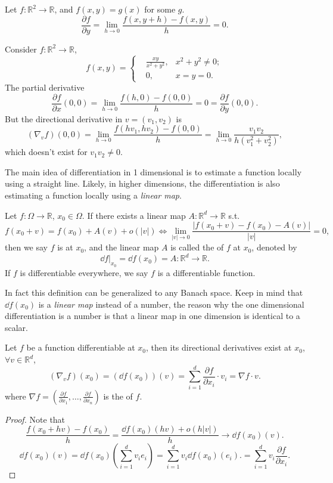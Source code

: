 \begin{example}
    Let $f: \mathbb{R}^2\to \mathbb{R}$, and $f(x,y) = g(x)$ for some $g$.
	\[
	\frac{\partial f}{\partial y} = \lim_{h\to 0}\frac{f(x,y+h) - f(x,y)}{h} = 0.
	\]
\end{example}
\begin{example}
    Consider $f: \mathbb{R}^2\to \mathbb{R}$,
	\[
	f(x,y) = \left\{
	\begin{aligned}
		&\frac{xy}{x^2+y^2}, &x^2+y^2 \ne 0;\\
		&0, &x = y =0.
	\end{aligned}\right.
	\]
	The partial derivative
	\[
		\frac{\partial f}{\partial x}(0,0) =
		\lim_{h\to 0} \frac{f(h,0)-f(0,0)}{h} = 0 = \frac{\partial f}{\partial y}(0,0).
	\]
	But the directional derivative in $v=(v_1,v_2)$ is
	\[
		(\nabla_v f)(0,0) = \lim_{h\to 0}\frac{f(hv_1,hv_2) - f(0,0)}{h}
		= \lim_{h\to 0}\frac{v_1v_2}{h(v_1^2+v_2^2)},
	\]
	which doesn't exist for $v_1v_2\ne 0$.
\end{example}

The main idea of differentiation in 1 dimensional is to estimate a function
locally using a straight line. Likely, in higher dimensions, the differentiation
is also estimating a function locally using a \textit{linear map}.

\begin{definition}[Differentiation]
	Let $f: \Omega \to \mathbb{R}$, $x_0\in \Omega$.
	If there exists a linear map $A:\mathbb{R}^{d}\to \mathbb{R}$ s.t.
	\[
	f(x_0 + v) = f(x_0) + A(v) + o(|v|)\iff
	\lim_{|v|\to 0}\frac{|f(x_0+v)-f(x_0)-A(v)|}{|v|} = 0,
	\]
	then we say $f$ is  at $x_0$, and the linear map $A$
	is called the  of $f$ at $x_0$, denoted by
	\[
	\dd f\big|_{x_0} = \dd f(x_0) = A: \mathbb{R}^{d} \to \mathbb{R}.
	\]
	If $f$ is differentiable everywhere, we say $f$ is a differentiable function.
\end{definition}
\begin{remark}
    In fact this definition can be generalized to any Banach space.
	Keep in mind that $\dd f(x_0)$ is a \textit{linear map} instead of a number,
	the reason why the one dimensional differentiation is a number
	is that a linear map in one dimension is identical to a scalar.
\end{remark}

\begin{theorem}
    Let $f$ be a function differentiable at $x_0$, then its directional derivatives exist
	at $x_0$, $\forall v\in \mathbb{R}^{d}$,
	\[
		(\nabla_v f)(x_0) = (\dd f(x_0))(v)
		= \sum_{i=1}^{d} \frac{\partial f}{\partial x_i}\cdot v_i = \nabla f\cdot v.
	\]
	where $\nabla f = (\frac{\partial f}{\partial x_1}, \dots,
	\frac{\partial f}{\partial x_n})$ is the  of $f$.
\end{theorem}
\begin{proof}[Proof]
    Note that
	\[
	\frac{f(x_0+hv) - f(x_0)}{h} = \frac{\dd f(x_0)(hv) + o(h|v|)}{h} \to \dd f(x_0)(v).
	\]
	\[
	\dd f(x_0)(v) = \dd f(x_0)\left(\sum_{i=1}^{d} v_ie_i\right)
	= \sum_{i=1}^{d} v_i\dd f(x_0)(e_i).
	= \sum_{i=1}^{d} v_i \frac{\partial f}{\partial x_i}.
	\]
\end{proof}

